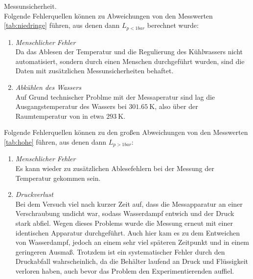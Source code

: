 Messunsicherheit.\\
Folgende Fehlerquellen können zu Abweichungen von den Messwerten \ref{tab:niedringe} führen, aus denen
dann $L_{p<1bar}$ berechnet wurde:
\begin{enumerate}
  \item \textit{Menschlicher Fehler}\\
    Da das Ablesen der Temperatur und die Regulierung des Kühlwassers nicht automatisiert, sondern durch
    einen Menschen durchgeführt wurden, sind die Daten mit zusätzlichen Messunsicherheiten behaftet.
  \item \textit{Abkühlen des Wassers}\\
    Auf Grund technischer Problme mit der Messaperatur sind lag die Ausgangstemperatur des Wassers
    bei $\SI{301.65}{\kelvin}$, also über der Raumtemperatur von in etwa $\SI{293}{\kelvin}$.
\end{enumerate}
Folgende Fehlerquellen können zu den großen Abweichungen von den Messwerten \ref{tab:hohe} führen, aus denen
dann $L_{p>1bar}$:
\begin{enumerate}
  \item \textit{Menschlicher Fehler}\\
    Es kann wieder zu zusätzlichen Ablesefehlern bei der Messung der Temperatur gekommen sein.
  \item \textit{Druckverlust}\\
    Bei dem Versuch viel nach kurzer Zeit auf, dass die Messapparatur an einer Verschraubung undicht war,
    sodass Wasserdampf entwich und der Druck stark abfiel. Wegen dieses Problems wurde die Messung
    erneut mit einer identischen Apparatur durchgeführt. Auch hier kam es zu dem Entweichen von Wasserdampf,
    jedoch an einem sehr viel späteren Zeitpunkt und in einem geringeren Ausmaß. Trotzdem ist ein systematischer
    Fehler durch den Druckabfall wahrscheinlich, da die Behälter laufend an Druck und Flüssigkeit verloren haben, auch
    bevor das Problem den Experimentierenden auffiel.
\end{enumerate}


